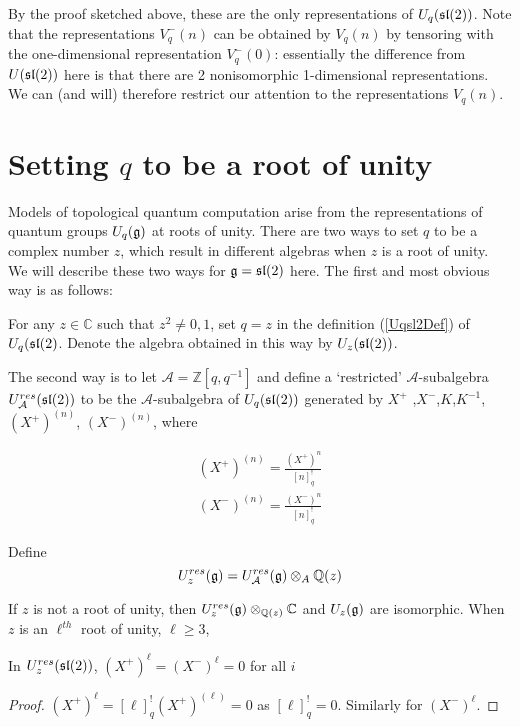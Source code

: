 By the proof sketched above, these are the only representations of
$U_q(\mathfrak{sl}(2))$.  Note that the representations $V_q^-(n)$ can be obtained by
$V_q(n)$ by tensoring with the one-dimensional representation $V_q^-(0)$:
essentially the difference from $U(\mathfrak{sl}(2))$ here is that there are 2
nonisomorphic 1-dimensional representations. We can (and will) therefore
restrict our attention to the representations $V_q(n)$.

\section{Setting $q$ to be a root of unity}

Models of topological quantum computation arise from the representations of
quantum groups $U_q(\mathfrak{g})$ at roots of unity. There are two ways to set $q$ to
be a complex  number  $z$, which result in different algebras when
$z$ is a root of unity. We will describe these two ways for $\mathfrak{g} =
\mathfrak{sl}(2)$ here. The first and most obvious way is as follows: 

For any $z \in \mathbb{C}$ such that $z ^2 \neq 0,1$, set $q =
z$ in the definition (\ref{Uqsl2Def}) of $U_q(\mathfrak{sl}(2)$. Denote the
algebra obtained in this way by $U_z(\mathfrak{sl}(2))$. 

The second way is to let $\mathcal{A} = \mathbb{Z}[q,q^{-1}]$ and define a
`restricted' $\mathcal{A}$-subalgebra $U_\mathcal{A}^{res}(\mathfrak{sl}(2))$ to be the
$\mathcal{A}$-subalgebra of $U_q(\mathfrak{sl}(2))$ generated by $ X^+$ ,$X^-$,$K$,$K^{-1}$, $(X^+) ^{(n)}$,
$(X^-)^{(n)}$, where


\begin{align}
     (X^+)^{(n)} = \frac{ (X^+)^n}{[n]^!_{q}} \\
    (X^-)^{(n)} = \frac{(X^-)^n}{[n]^!_{q}} 
\end{align}


Define 
\begin{equation}
    U_z^{res}(\mathfrak{g}) = U_\mathcal{A}^{res}(\mathfrak{g}) \otimes_A \mathbb{Q}(z)
\end{equation}

If $z$ is not a root of unity, then $U_z^{res}(\mathfrak{g})
\otimes_{\mathbb{Q}(z)} \mathbb{C}$ and $U_z(\mathfrak{g})$ are
isomorphic. When $z$ is an $\ell^{th}$ root of unity, $\ell \geq 3$,

\begin{lemma}
    In $U_z^{res}(\mathfrak{sl}(2))$, $ (X^+)^\ell = (X^-)^\ell = 0$ for all $i$
\end{lemma}
\begin{proof}
    $ (X^+)^\ell = [\ell]_{q}^!  (X^+)^{(\ell)} = 0$ as $[\ell]_{q}^! = 0$. Similarly for $(X^-)^\ell$.
\end{proof}

